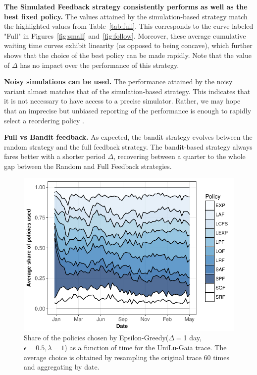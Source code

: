 \documentclass[sigconf,anonymous]{acmart}
\begin{document}
\textbf{The Simulated Feedback strategy consistently performs as well as the
best fixed policy.} The values attained by the simulation-based strategy match
the highlighted values from Table~\ref{tab:full}. This corresponds to the curve
labeled "Full" in Figures~\ref{fig:small} and~\ref{fig:follow}. Moreover,
these average cumulative waiting time curves exhibit linearity (as opposed to
being concave), which further shows that the choice of the best policy can be
made rapidly.  Note that the value of $\Delta$ has no impact over the
performance of this strategy.

\textbf{Noisy simulations can be used.} The performance attained by the noisy
variant almost matches that of the simulation-based strategy. This indicates
that it is not necessary to have access to a precise simulator. Rather, we may
hope that an imprecise but unbiased reporting of the performance is enough to
rapidly select a reordering policy .

\textbf{Full vs Bandit feedback.} As expected, the bandit strategy evolves
between the random strategy and the full feedback strategy. The bandit-based
strategy always fares better with a shorter period $\Delta$, recovering between
a quarter to the whole gap between the Random and Full Feedback strategies.

\begin{figure}[]
  \centering
  \includegraphics[scale=0.6]{figures/mosaicbandit-UniLu-Ga.pdf}

  \caption{Share of the policies chosen by Epsilon-Greedy($\Delta=$1 day,
  $\epsilon = 0.5, \lambda = 1 $) as a function of time for the UniLu-Gaia
trace. The average choice is obtained by resampling the original trace 60 times
and aggregating by date.}

  \label{fig:mosb}
\end{figure}
\end{document}
